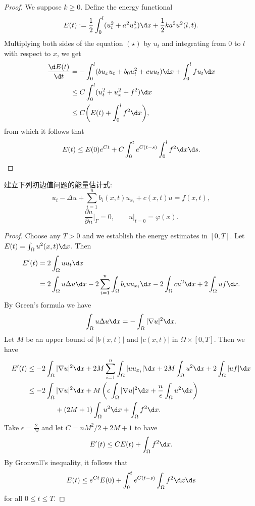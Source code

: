\begin{proof}
  We suppose $k\geq 0$. Define the energy functional
  \[ E(t) := \frac12 \int_0^l (u_t^2 + a^2 u_x^2) \d x + \frac12 ka^2 u^2(l,t). \]
  Multiplying both sides of the equation $(\star)$ by $u_t$ and integrating
  from $0$ to $l$ with respect to $x$, we get
  \begin{align*}
    \frac{\d E(t)}{\d t}
    & = - \int_0^l (bu_xu_t + b_0 u_t^2 + cuu_t) \d x
        + \int_0^l fu_t \d x \\
    & \leq C\int_0^l (u_t^2 + u_x^2 + f^2) \d x \\
    & \leq C\biggl(E(t) + \int_0^l f^2 \d x\biggr),
  \end{align*}
  from which it follows that
  \[ E(t) \leq E(0)e^{Ct} + C\int_0^t e^{C(t-s)} \int_0^l f^2 \d x\d s. \]
\end{proof}


\begin{exercise}
  建立下列初边值问题的能量估计式:
  \[u_t - \Delta u + \sum_{i=1}^n b_i(x,t) u_{x_i} + c(x,t)u = f(x,t),\]
  \[\frac{\partial u}{\partial n}\bigg|_{\varGamma} = 0,
    \qquad u|_{t=0} = \varphi(x).\]
\end{exercise}

\begin{proof}
  Choose any $T>0$ and we establish the energy estimates in $[0,T]$.
  Let $E(t) = \int_{\Omega} u^2(x,t) \d x$. Then
  \begin{align*}
    E'(t)
    & = 2\int_{\Omega} uu_t \d x \\
    & = 2\int_{\Omega}u\Delta u\d x
        - 2\sum_{i=1}^n\int_{\Omega}b_iuu_{x_i}\d x
        - 2\int_{\Omega}cu^2\d x+2\int_{\Omega}uf\d x.
  \end{align*}
  By Green's formula we have
  \[ \int_{\Omega} u\Delta u \d x = -\int_{\Omega}|\nabla u|^2\d x. \]
  Let $M$ be an upper bound of $|b(x,t)|$ and $|c(x,t)|$
  in $\overline{\Omega}\times [0,T]$. Then we have
  \begin{align*}
    E'(t)
    & \leq -2\int_{\Omega}|\nabla u|^2\d x
      + 2M \sum_{i=1}^n\int_{\Omega}|uu_{x_i}|\d x
      + 2M \int_{\Omega}u^2\d x+2\int_{\Omega}|uf|\d x \\
    & \leq -2\int_{\Omega}|\nabla u|^2\d x
        + M \left(\epsilon\int_{\Omega}|\nabla u|^2\d x
        + \frac{n}{\epsilon}\int_{\Omega}u^2\d x\right) \\
    & \qquad\qquad + (2M+1)\int_{\Omega}u^2\d x+\int_{\Omega}f^2\d x.
  \end{align*}
  Take $\epsilon = \frac{2}{M}$ and let $C = nM^2/2 + 2M + 1$ to have
  \[ E'(t) \leq CE(t) + \int_{\Omega} f^2 \d x. \]
  By Gronwall's inequality, it follows that
  \[ E(t) \leq e^{Ct}E(0) + \int_0^t e^{C(t-s)} \int_{\Omega} f^2 \d x\d s\]
  for all $0\leq t\leq T$.
\end{proof}


